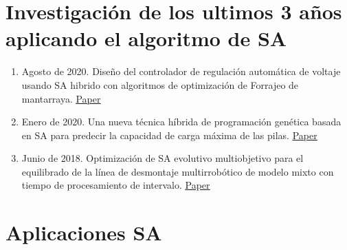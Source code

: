 \documentclass[10pt]{article}
\begin{document}
\section{Investigación de los ultimos 3 años aplicando el algoritmo de SA}
\begin{enumerate}
  \item Agosto de 2020. Diseño del controlador de regulación automática de voltaje usando SA hibrido con algoritmos de optimización de Forrajeo de mantarraya. \underline{\href{https://www.sciencedirect.com/science/article/pii/S2090447920301416}{Paper}}
  \item Enero de 2020. Una nueva técnica híbrida de programación genética basada en SA para predecir la capacidad de carga máxima de las pilas. \underline{\href{https://link.springer.com/article/10.1007/s00366-019-00932-9}{Paper}}
  \item Junio de 2018. Optimización de SA evolutivo multiobjetivo para el equilibrado de la línea de desmontaje multirrobótico de modelo mixto con tiempo de procesamiento de intervalo. \underline{\href{https://www.tandfonline.com/doi/abs/10.1080/00207543.2019.1602290}{Paper}}
\end{enumerate}
\section{Aplicaciones SA}
\end{document}
